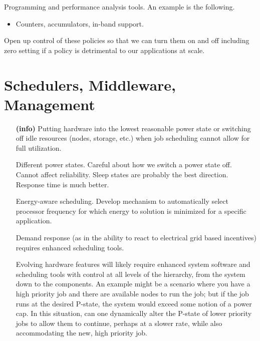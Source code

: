 \begin{itemize}
Programming and performance analysis tools. An example is the following.
\begin{itemize}
\item
Counters, accumulators, in-band support.
\end{itemize}

Open up control of these policies so that we can turn them on and off including   
zero setting if a policy is detrimental to our applications at scale. 
\end{itemize}

\section{Schedulers, Middleware, Management}
\begin{itemize}
\item[\textbf{(info)}]
Putting hardware into the lowest reasonable power state or switching off idle 
resources (nodes, storage, etc.) when job scheduling cannot allow for full utilization. 

Different power states. Careful about how we switch a power state off.  Cannot affect reliability.  
Sleep states are probably the best direction.  Response time is much better.

Energy-aware scheduling. Develop mechanism to automatically select processor 
frequency for which energy to solution is minimized for a specific application.

Demand response (as in the ability to react to electrical grid based incentives)
requires enhanced scheduling tools. 

Evolving hardware features will likely require enhanced system software and scheduling 
tools with control at all levels of the hierarchy, from the system down to the components.  
An example might be a scenario where you have a high priority job and there are available 
nodes to run the job; but if the job runs at the desired P-state, the system would exceed some 
notion of a power cap.  In this situation, can one dynamically alter the P-state of lower 
priority jobs to allow them to continue, perhaps at a slower rate, while also accommodating 
the new, high priority job.
\end{itemize}

